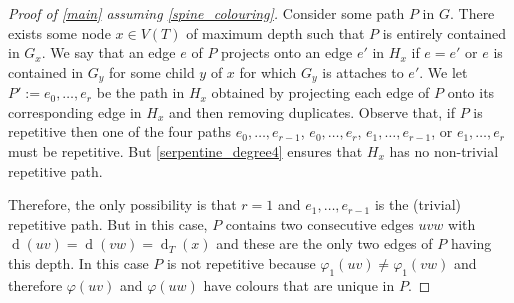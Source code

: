 \documentclass[kpfonts]{patmorin}
\DeclareMathOperator{\depth}{d}
\begin{document}
\begin{proof}[Proof of \cref{main} assuming \cref{spine_colouring}]
    Consider some path $P$ in $G$.  There exists some node $x\in V(T)$ of maximum depth such that $P$ is entirely contained in $G_x$.  We say that an edge $e$ of $P$ projects onto an edge $e'$ in $H_x$ if $e=e'$ or $e$ is contained in $G_y$ for some child $y$ of $x$ for which $G_y$ is attaches to $e'$. We let $P':=e_0,\ldots,e_r$ be the path in $H_x$ obtained by projecting each edge of $P$ onto its corresponding edge in $H_x$ and then removing duplicates. Observe that, if $P$ is repetitive then one of the four paths $e_0,\ldots,e_{r-1}$, $e_0,\ldots,e_r$, $e_1,\ldots,e_{r-1}$, or $e_1,\ldots,e_r$ must be repetitive.  But \cref{serpentine_degree4} ensures that $H_x$ has no non-trivial repetitive path.

    Therefore, the only possibility is that $r=1$ and $e_1,\ldots,e_{r-1}$ is the (trivial) repetitive path.  But in this case, $P$ contains two consecutive edges $uvw$ with $\depth(uv)=\depth(vw)=\depth_T(x)$ and these are the only two edges of $P$ having this depth.  In this case $P$ is not repetitive because $\varphi_1(uv)\neq\varphi_1(vw)$ and therefore $\varphi(uv)$ and $\varphi(uw)$ have colours that are unique in $P$.
\end{proof}
\end{document}
